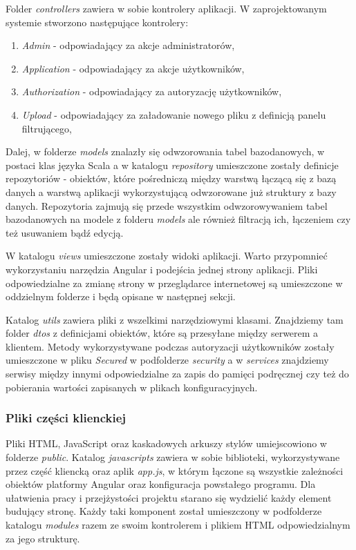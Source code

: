 \documentclass[a4paper,12pt,twoside]{article}
\begin{document}
Folder \textit{controllers} zawiera w sobie kontrolery aplikacji.
W zaprojektowanym systemie stworzono następujące kontrolery:
\begin{enumerate}[1)]
\item \textit{Admin} - odpowiadający za akcje administratorów,
\item \textit{Application} - odpowiadający za akcje użytkowników,
\item \textit{Authorization} - odpowiadający za autoryzację użytkowników,
\item \textit{Upload} - odpowiadający za załadowanie nowego pliku z definicją panelu filtrującego,
\end{enumerate}

Dalej, w folderze \textit{models} znalazły się odwzorowania tabel bazodanowych,
w postaci klas języka Scala a w katalogu \textit{repository} umieszczone
zostały definicje repozytoriów - obiektów, które pośredniczą
między warstwą łączącą się z bazą danych a warstwą aplikacji
wykorzystującą odwzorowane już struktury z bazy danych.
Repozytoria zajmują się przede wszystkim odwzorowywaniem tabel bazodanowych na
modele z folderu \textit{models} ale również filtracją ich, łączeniem
czy też usuwaniem bądź edycją.

W katalogu \textit{views} umieszczone zostały widoki aplikacji.
Warto przypomnieć wykorzystaniu narzędzia Angular
i podejścia jednej strony aplikacji. Pliki odpowiedzialne
za zmianę strony w przeglądarce internetowej są umieszczone
w oddzielnym folderze i będą opisane w następnej sekcji.

Katalog \textit{utils} zawiera pliki z wszelkimi narzędziowymi
klasami. Znajdziemy tam folder \textit{dtos} z definicjami obiektów,
które są przesyłane między serwerem a klientem.
Metody wykorzystywane podczas autoryzacji użytkowników zostały umieszczone w pliku \textit{Secured} w podfolderze \textit{security} a w \textit{services} znajdziemy
serwisy między innymi odpowiedzialne za zapis do pamięci podręcznej czy też
do pobierania wartości zapisanych w plikach konfiguracyjnych.

\newpage
\subsubsection{Pliki części klienckiej}

Pliki HTML, JavaScript oraz kaskadowych arkuszy stylów umiejscowiono
w folderze \textit{public}.
Katalog \textit{javascripts} zawiera w sobie biblioteki, wykorzystywane przez
część kliencką oraz aplik \textit{app.js}, w którym łączone są wszystkie
zależności obiektów platformy Angular oraz konfiguracja powstałego programu.
Dla ułatwienia pracy i przejżystości projektu starano się wydzielić każdy element budujący stronę. Każdy taki komponent został umieszczony w podfolderze
katalogu \textit{modules} razem ze swoim kontrolerem i plikiem HTML odpowiedzialnym
za jego strukturę.
\end{document}
